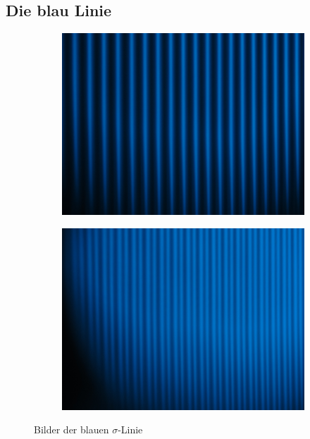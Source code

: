 \subsection{Die blau Linie}
\begin{figure}
  \centering
  \begin{subfigure}{0.4\textwidth}
    \centering
    \includegraphics[width=\textwidth]{Bilder/blau_sigma_ohne_B.JPG}
  \end{subfigure}
  \begin{subfigure}{0.4\textwidth}
    \centering
    \includegraphics[width=\textwidth]{Bilder/blau_sigma_mit_B.JPG}
  \end{subfigure}
  \caption{Bilder der blauen $\sigma$-Linie}
  \label{fig:blau_sigma_Linie}
\end{figure}

